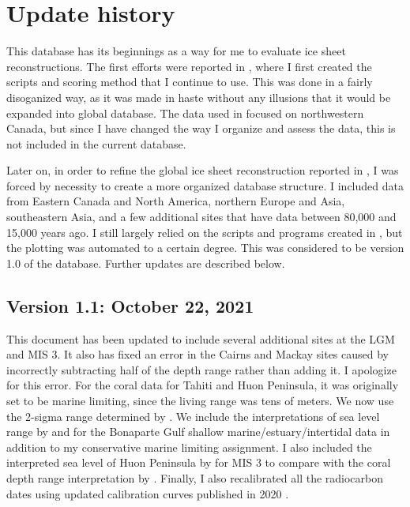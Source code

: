 \section{Update history}

This database has its beginnings as a way for me to evaluate ice sheet reconstructions. The first efforts were reported in \citet{GowanEtal2016}, where I first created the scripts and scoring method that I continue to use. This was done in a fairly disoganized way, as it was made in haste without any illusions that it would be expanded into global database. The data used in \citet{GowanEtal2016} focused on northwestern Canada, but since I have changed the way I organize and assess the data, this is not included in the current database.

Later on, in order to refine the global ice sheet reconstruction reported in \citet{GowanEtal2021b}, I was forced by necessity to create a more organized database structure. I included data from Eastern Canada and North America, northern Europe and Asia, southeastern Asia, and a few additional sites that have data between 80,000 and 15,000 years ago. I still largely relied on the scripts and programs created in \citet{GowanEtal2016}, but the plotting was automated to a certain degree. This was considered to be version 1.0 of the database. Further updates are described below.

\subsection{Version 1.1: October 22, 2021}

This document has been updated to include several additional sites at the LGM and MIS 3. It also has fixed an error in the Cairns and Mackay sites caused by incorrectly subtracting half of the depth range rather than adding it. I apologize for this error. For the coral data for Tahiti and Huon Peninsula, it was originally set to be marine limiting, since the living range was tens of meters. We now use the 2-sigma range determined by \citet{HibbertEtal2016}. We include the interpretations of sea level range by \citet{IshiwaEtal2019} and \citet{YokoyamaEtal2000} for the Bonaparte Gulf shallow marine/estuary/intertidal data in addition to my conservative marine limiting assignment. I also included the interpreted sea level of Huon Peninsula by \citet{deGelderEtal2022} for MIS 3 to compare with the coral depth range interpretation by \citet{HibbertEtal2016}. Finally, I also recalibrated all the radiocarbon dates using updated calibration curves published in 2020 \citep{HeatonEtal2020,HoggEtal2020,ReimerEtal2020}.


